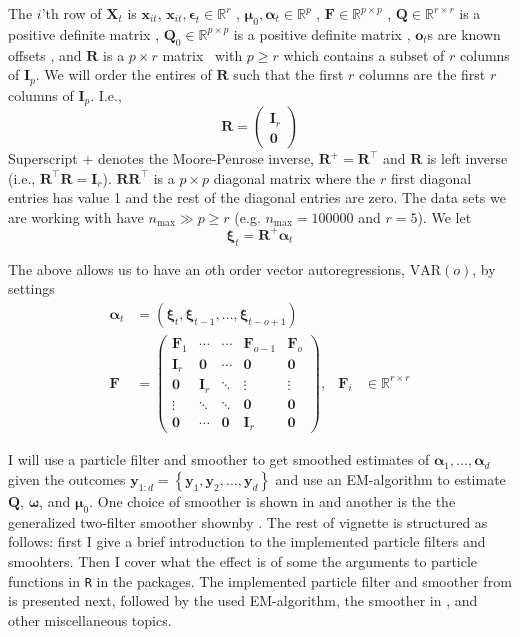 \documentclass[notitlepage]{article}
\renewcommand{\vec}[1]{\bm{#1}}
\newcommand{\mat}[1]{\mathbf{#1}}
\newcommand{\Lbrace}[1]{\left\{ #1\right\}}
\newcommand{\Lparen}[1]{\left( #1\right)}
\newcommand{\optor}[2]{#1\Lparen{#2}}
\newcommand{\dimState}{p}
\newcommand{\dimRng}{r}
\newcommand{\nPeriods}{d}
\newcommand{\nMax}{n_{\text{max}}}
\newcommand\MVAR[1]{\optor{\text{VAR}}{#1}}
\begin{document}
The $i$'th row of $\mat{X}_t$ is $\vec{x}_{it}$, $\vec{x}_{it},\vec{\epsilon}_t\in\mathbb{R}^\dimRng$%
, $\vec\mu_0,\vec{\alpha}_t\vec\in\mathbb{R}^\dimState$%
, $\mat{F} \in \mathbb{R}^{\dimState\times\dimState}$%
, $\mat{Q} \in \mathbb{R}^{\dimRng\times\dimRng}$ is a positive definite matrix%
, $\mat{Q}_0 \in \mathbb{R}^{\dimState\times\dimState}$ is a positive definite matrix%
, $\vec{o}_t$s are known offsets%
, and $\mat{R}$ is a $\dimState\times\dimRng$ matrix%
~with $\dimState\geq\dimRng$ which contains a subset of $r$ columns of $\mat{I}_{\dimState}$. We will order the entires of $\mat R$ such that the first $\dimRng$ columns are the 
first $\dimRng$ columns of $\mat{I}_{\dimState}$. I.e.,%
%
$$\mat{R} = \begin{pmatrix}
	\mat I_\dimRng  \\
	\mat 0 
\end{pmatrix}$$%
%
Superscript $+$ denotes the Moore-Penrose inverse, $\mat{R}^+ = \mat{R}^\top$ and $\mat{R}$ is left inverse (i.e., $\mat{R}^\top\mat{R} = \mat{I}_\dimRng$). $\mat{R}\mat{R}^\top$ is a $\dimState\times\dimState$ diagonal matrix where the $\dimRng$ 
first diagonal entries has value 1 and the rest of the diagonal entries are zero. 
The data sets we are working with have 
$\nMax \gg \dimState \geq \dimRng$ (e.g. $\nMax = 100000$ and $\dimRng = 5$). We let %
%
$$\vec{\xi}_{t} = \mat{R}^{+}\vec{\alpha}_t$$

The above allows us to have an $o$th order vector autoregressions, $\MVAR{o}$, by settings%
%
\begin{align*}
\vec\alpha_t &= (\vec\xi_t,\vec\xi_{t-1},\dots, \vec\xi_{t - o + 1}) \\
\mat F &= \begin{pmatrix}
 \mat F_1    & \cdots & \cdots & \mat F_{o-1} & \mat F_o \\
 \mat I_\dimRng    & \mat 0      & \cdots & \mat 0 & \mat 0 \\
 \mat 0      &  \mat I_\dimRng    & \ddots & \vdots & \vdots \\
 \vdots & \ddots & \ddots & \mat 0 & \mat 0 \\
 \mat 0      & \cdots & \mat 0 & \mat I_\dimRng & \mat 0 
\end{pmatrix}, & \mat F_i &\in \mathbb{R}^{\dimRng\times\dimRng}
\end{align*}

I will use a particle filter and smoother to get smoothed estimates of 
$\vec{\alpha}_1, \dots, \vec{\alpha}_\nPeriods$ given the outcomes 
$\vec{y}_{1:\nPeriods} = \Lbrace{\vec{y}_1,\vec{y}_2,\dots, \vec{y}_\nPeriods}$ and use 
an EM-algorithm to estimate $\mat{Q}$, $\vec\omega$, and $\vec\mu_0$. One choice of smoother is 
shown in \cite{fearnhead10} and another is the the generalized two-filter smoother shownby \cite{briers09}. 
The rest of
vignette is structured as follows: first I give a brief introduction to the implemented particle
filters and smoohters. Then I cover what the effect is of some the arguments to 
particle functions in \texttt{R} in the packages. 
The implemented particle filter and smoother from \cite{fearnhead10} is presented next, followed by 
the used EM-algorithm, the smoother in \cite{briers09}, and other miscellaneous topics.
  
\end{document}
